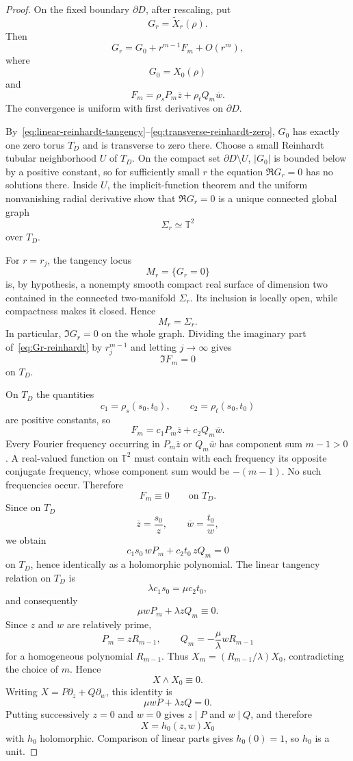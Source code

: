 \documentclass[10pt,a4paper]{amsart}
\newcommand{\T}{\mathbb T}
\newcommand{\ol}{\overline}
\begin{document}
\begin{proof}
On the fixed boundary $\partial D$, after rescaling, put
\[
 G_r=\widetilde X_r(\rho).
\]
Then
\begin{equation}\label{eq:Gr-reinhardt}
 G_r=G_0+r^{m-1}F_m+O(r^m),
\end{equation}
where
\[
 G_0=X_0(\rho)
\]
and
\[
 F_m=\rho_sP_m\ol z+\rho_tQ_m\ol w.
\]
The convergence is uniform with first derivatives on $\partial D$.

By~\eqref{eq:linear-reinhardt-tangency}--\eqref{eq:transverse-reinhardt-zero}, $G_0$ has exactly one zero torus $T_D$ and is transverse to zero there. Choose a small Reinhardt tubular neighborhood $U$ of $T_D$. On the compact set $\partial D\setminus U$, $|G_0|$ is bounded below by a positive constant, so for sufficiently small $r$ the equation $\Re G_r=0$ has no solutions there. Inside $U$, the implicit-function theorem and the uniform nonvanishing radial derivative show that $\Re G_r=0$ is a unique connected global graph
\[
 \Sigma_r\simeq\T^2
\]
over $T_D$.

For $r=r_j$, the tangency locus
\[
 M_r=\{G_r=0\}
\]
is, by hypothesis, a nonempty smooth compact real surface of dimension two contained in the connected two-manifold $\Sigma_r$. Its inclusion is locally open, while compactness makes it closed. Hence
\[
 M_r=\Sigma_r.
\]
In particular, $\Im G_r=0$ on the whole graph. Dividing the imaginary part of~\eqref{eq:Gr-reinhardt} by $r_j^{m-1}$ and letting $j\to\infty$ gives
\[
 \Im F_m=0
\]
on $T_D$.

On $T_D$ the quantities
\[
 c_1=\rho_s(s_0,t_0),\qquad c_2=\rho_t(s_0,t_0)
\]
are positive constants, so
\[
 F_m=c_1P_m\ol z+c_2Q_m\ol w.
\]
Every Fourier frequency occurring in $P_m\ol z$ or $Q_m\ol w$ has component sum $m-1>0$. A real-valued function on $\T^2$ must contain with each frequency its opposite conjugate frequency, whose component sum would be $-(m-1)$. No such frequencies occur. Therefore
\[
 F_m\equiv0\qquad\text{on }T_D.
\]
Since on $T_D$
\[
 \ol z=\frac{s_0}{z},\qquad \ol w=\frac{t_0}{w},
\]
we obtain
\[
 c_1s_0\,wP_m+c_2t_0\,zQ_m=0
\]
on $T_D$, hence identically as a holomorphic polynomial. The linear tangency relation on $T_D$ is
\[
 \lambda c_1s_0=\mu c_2t_0,
\]
and consequently
\[
 \mu wP_m+\lambda zQ_m\equiv0.
\]
Since $z$ and $w$ are relatively prime,
\[
 P_m=zR_{m-1},\qquad
 Q_m=-\frac{\mu}{\lambda}wR_{m-1}
\]
for a homogeneous polynomial $R_{m-1}$. Thus $X_m=(R_{m-1}/\lambda)X_0$, contradicting the choice of $m$. Hence
\[
 X\wedge X_0\equiv0.
\]
Writing $X=P\partial_z+Q\partial_w$, this identity is
\[
 \mu wP+\lambda zQ=0.
\]
Putting successively $z=0$ and $w=0$ gives $z\mid P$ and $w\mid Q$, and therefore
\[
 X=h_0(z,w)X_0
\]
with $h_0$ holomorphic. Comparison of linear parts gives $h_0(0)=1$, so $h_0$ is a unit.
\end{proof}
\end{document}
